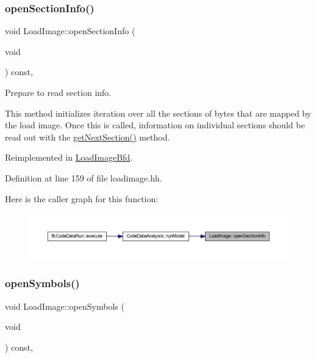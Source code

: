 \subsubsection{\texorpdfstring{openSectionInfo()}{openSectionInfo()}}
{\footnotesize\ttfamily void Load\+Image\+::open\+Section\+Info (\begin{DoxyParamCaption}\item[{void}]{ }\end{DoxyParamCaption}) const\hspace{0.3cm}{\ttfamily [inline]}, {\ttfamily [virtual]}}



Prepare to read section info. 

This method initializes iteration over all the sections of bytes that are mapped by the load image. Once this is called, information on individual sections should be read out with the \mbox{\hyperlink{class_load_image_ab4a927238becd33d8eb75ddc96cc9616}{get\+Next\+Section()}} method. 

Reimplemented in \mbox{\hyperlink{class_load_image_bfd_a48e82236ac85863f02e49e3ecae877e1}{Load\+Image\+Bfd}}.



Definition at line 159 of file loadimage.\+hh.

Here is the caller graph for this function\+:
\nopagebreak
\begin{figure}[H]
\begin{center}
\leavevmode
\includegraphics[width=350pt]{class_load_image_a915fb52632f5d770511833ed1cb76088_icgraph}
\end{center}
\end{figure}
\mbox{\label{class_load_image_a5b17f1d68413ab802966bdc7aa07cc73}} 
\subsubsection{\texorpdfstring{openSymbols()}{openSymbols()}}
{\footnotesize\ttfamily void Load\+Image\+::open\+Symbols (\begin{DoxyParamCaption}\item[{void}]{ }\end{DoxyParamCaption}) const\hspace{0.3cm}{\ttfamily [inline]}, {\ttfamily [virtual]}}



